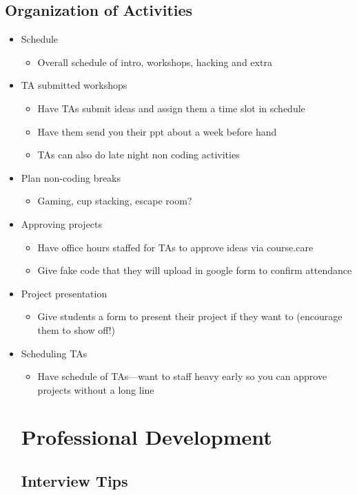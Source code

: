 \documentclass[a4paper]{article}
\begin{document}
\subsection{Organization of Activities}
\begin{itemize}
\item Schedule
\begin{itemize}
\item Overall schedule of intro, workshops, hacking and extra
\end{itemize}
\item TA submitted workshops
\begin{itemize}
\item Have TAs submit ideas and assign them a time slot in schedule
\item Have them send you their ppt about a week before hand
\item TAs can also do late night non coding activities
\end{itemize}
\item Plan non-coding breaks
\begin{itemize}
\item Gaming, cup stacking, escape room?
\end{itemize}
\item Approving projects
\begin{itemize}
\item Have office hours staffed for TAs to approve ideas via course.care
\item Give fake code that they will upload in google form to confirm attendance
\end{itemize} 
\item Project presentation
\begin{itemize}
\item Give students a form to present their project if they want to (encourage them to show off!)
\end{itemize}
\item Scheduling TAs
\begin{itemize}
\item Have schedule of TAs—want to staff heavy early so you can approve projects without a long line
\end{itemize}
\section{Professional Development}
\subsection{Interview Tips}


\end{itemize}
\end{document}
